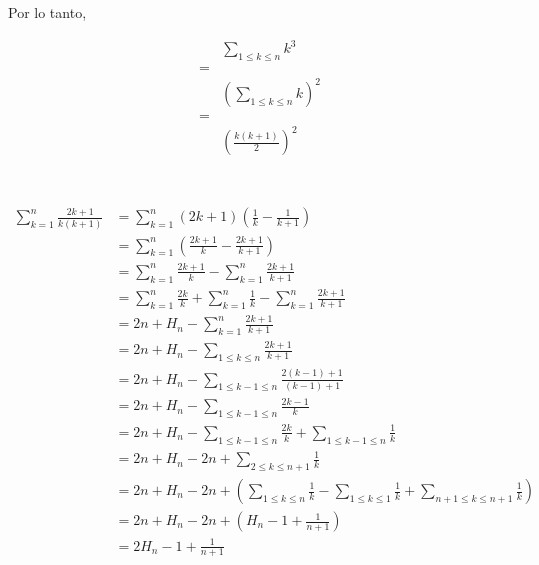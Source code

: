 \documentclass{article}
\begin{document}
Por lo tanto,

\begin{align*}
 & \sum_{1 \leq k \leq n} k^3 \\
 = & \\
 & \left(\sum_{1 \leq k \leq n} k \right)^2 \\
 = & \\
 & \left( \frac{k(k+1)}{2} \right)^2 \\
\end{align*}

\section{} %

\subsection{} %

\begin{align*}
\sum_{k=1}^n \frac{2k+1}{k(k+1)} & = \sum_{k=1}^n (2k+1)(\frac{1}{k} - \frac{1}{k+1}) \\ 
  & = \sum_{k=1}^n (\frac{2k+1}{k} - \frac{2k+1}{k+1}) \\ 
  & = \sum_{k=1}^n \frac{2k+1}{k} - \sum_{k=1}^n \frac{2k+1}{k+1} \\
  & = \sum_{k=1}^n \frac{2k}{k} + \sum_{k=1}^n \frac{1}{k} - \sum_{k=1}^n \frac{2k+1}{k+1} \\
  & = 2n + H_n - \sum_{k=1}^n \frac{2k+1}{k+1} \\
  & = 2n + H_n - \sum_{1 \leq k \leq n} \frac{2k+1}{k+1} \\
  & = 2n + H_n - \sum_{1 \leq k-1 \leq n} \frac{2(k-1)+1}{(k-1)+1} \\
  & = 2n + H_n - \sum_{1 \leq k-1 \leq n} \frac{2k-1}{k} \\
  & = 2n + H_n - \sum_{1 \leq k-1 \leq n} \frac{2k}{k} + \sum_{1 \leq k-1 \leq n} \frac{1}{k} \\
  & = 2n + H_n - 2n + \sum_{2 \leq k \leq n+1} \frac{1}{k} \\
  & = 2n + H_n - 2n + (\sum_{1 \leq k \leq n} \frac{1}{k} - \sum_{1 \leq k \leq 1} \frac{1}{k} + \sum_{n+1 \leq k \leq n+1} \frac{1}{k}) \\
  & = 2n + H_n - 2n + (H_n - 1 + \frac{1}{n+1}) \\
  & = 2H_n - 1 + \frac{1}{n+1} \\
\end{align*}
\end{document}
